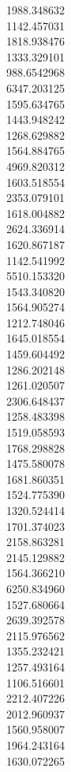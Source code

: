 1988.348632\\
1142.457031\\
1818.938476\\
1333.329101\\
988.6542968\\
6347.203125\\
1595.634765\\
1443.948242\\
1268.629882\\
1564.884765\\
4969.820312\\
1603.518554\\
2353.079101\\
1618.004882\\
2624.336914\\
1620.867187\\
1142.541992\\
5510.153320\\
1543.340820\\
1564.905274\\
1212.748046\\
1645.018554\\
1459.604492\\
1286.202148\\
1261.020507\\
2306.648437\\
1258.483398\\
1519.058593\\
1768.298828\\
1475.580078\\
1681.860351\\
1524.775390\\
1320.524414\\
1701.374023\\
2158.863281\\
2145.129882\\
1564.366210\\
6250.834960\\
1527.680664\\
2639.392578\\
2115.976562\\
1355.232421\\
1257.493164\\
1106.516601\\
2212.407226\\
2012.960937\\
1560.958007\\
1964.243164\\
1630.072265\\
